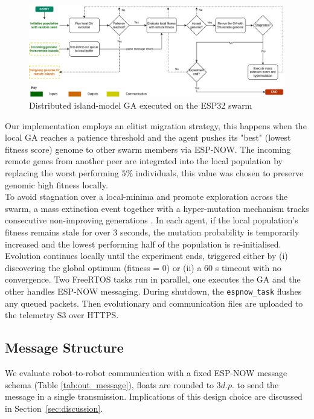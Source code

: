 \documentclass[conference]{IEEEtran}
\begin{document}
\begin{figure}[t]
    \centering
    \includegraphics[width=1\textwidth]{ga.png}
    \caption{Distributed island-model GA executed on the ESP32 swarm}
    \label{fig:ga}
\end{figure}

Our implementation employs an elitist migration strategy, this happens when the local GA reaches a patience threshold and the agent pushes its "best" (lowest fitness score) genome to other swarm members via ESP-NOW. The incoming remote genes from another peer are integrated into the local population by replacing the worst performing $5\%$ individuals, this value was chosen to preserve genomic high fitness locally. \\ 

To avoid stagnation over a local-minima and promote exploration across the swarm, a mass extinction event together with a hyper-mutation mechanism tracks consecutive non-improving generations \cite{krink_self-organized_2001}. In each agent, if the local population's fitness remains stale for over 3 seconds, the mutation probability is temporarily increased and the lowest performing half of the population is re-initialised. \\ 

Evolution continues locally until the experiment ends, triggered either by (i) discovering the global optimum (fitness = 0) or (ii) a 60 s timeout with no convergence. Two FreeRTOS tasks run in parallel, one executes the GA and the other handles ESP-NOW messaging. During shutdown, the \texttt{espnow\_task} flushes any queued packets. Then evolutionary and communication files are uploaded to the telemetry S3 over HTTPS.

\subsection{Message Structure}

We evaluate robot-to-robot communication with a fixed ESP-NOW message schema (Table \ref{tab:out_message}), floats are rounded to $3d.p.$ to send the message in a single transmission. Implications of this design choice are discussed in Section~\ref{sec:discussion}.
\end{document}
